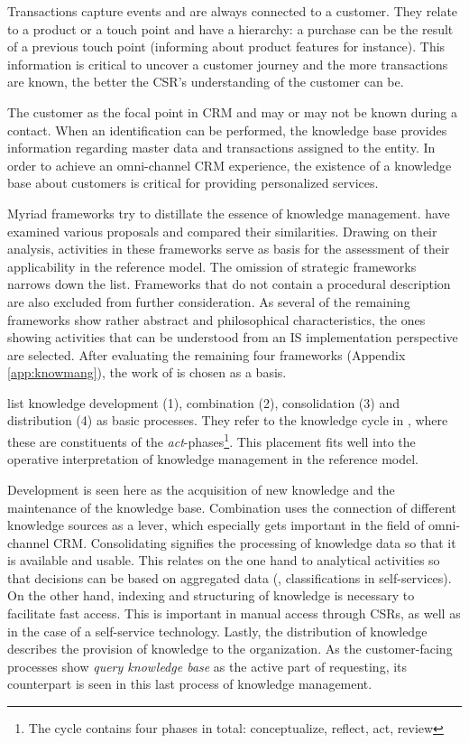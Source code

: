Transactions capture events and are always connected to a customer. They relate to a product or a touch point and have a hierarchy: a purchase can be the result of a previous touch point (informing about product features for instance). This information is critical to uncover a customer journey and the more transactions are known, the better the \acrshort{CSR}'s understanding of the customer can be. 

The customer as the focal point in \acrshort{CRM} and may or may not be known during a contact. When an identification can be performed, the knowledge base provides information regarding master data and transactions assigned to the entity. In order to achieve an omni-channel \acrshort{CRM} experience, the existence of a knowledge base about customers is critical for providing personalized services. 

Myriad frameworks try to distillate  the essence of knowledge management. \cite{Rubenstein_Montano_2001} have examined various proposals and compared their similarities. Drawing on their analysis, activities in these frameworks serve as basis for the assessment of their applicability in the reference model. The omission of strategic frameworks narrows down the list. Frameworks that do not contain a procedural description are also excluded from further consideration. As several of the remaining frameworks show rather abstract and philosophical characteristics, the ones showing activities that can be understood from an \acrshort{IS} implementation perspective are selected. After evaluating the remaining four frameworks (\cf Appendix \ref{app:knowmang}), the work of \citep{van_Heijst_1997} is chosen as a basis.

\citeauthor{van_Heijst_1997} list knowledge development (1), combination (2), consolidation (3) and distribution (4) as basic processes. They refer to the knowledge cycle in \citep{Wiig_1997}, where these are constituents of the \textit{act}-phases\footnote{The cycle contains four phases in total: conceptualize, reflect, act, review}. This placement fits well into the operative interpretation of knowledge management in the reference model. 

Development is seen here as the acquisition of new knowledge  \citep{van_Heijst_1997} and the maintenance of the knowledge base. Combination uses the connection of different knowledge sources as a lever, which especially gets important in the field of omni-channel \acrshort{CRM}. Consolidating signifies the processing of knowledge data so that it is available and usable. This relates on the one hand to analytical activities so that decisions can be based on aggregated data (\eg, classifications in self-services). On the other hand, indexing and structuring of knowledge is necessary to facilitate fast access. This is important in manual access through \acrshort{CSR}s, as well as in the case of a self-service technology. Lastly, the distribution of knowledge describes the provision of knowledge to the organization. As the customer-facing processes show \textit{query knowledge base} as the active part of requesting, its counterpart is seen in this last process of knowledge management. 

